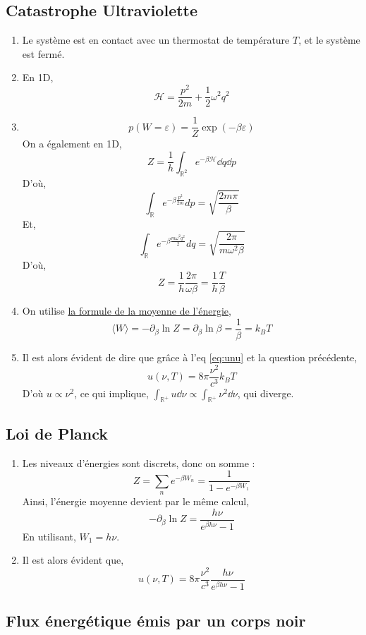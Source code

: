 \documentclass[a4paper,10pt]{report}
\begin{document}
	\subsection{Catastrophe Ultraviolette}
	\begin{enumerate}
	\item Le système est en contact avec un thermostat de température $T$, et le système est fermé.
	\item En 1D, $$\mathcal H = \frac{p^2}{2m} + \frac 1 2\omega^2 q^2$$
	\item $$p(W = \varepsilon) = \frac 1 Z \exp(-\beta \varepsilon)$$
	On a également en 1D, $$Z = \frac{1}{h} \int_{\mathbb{R}^2} e^{-\beta \mathcal H} \dd q \dd p$$
	D'où,
	$$\int_\mathbb{R} e^{-\beta \frac{p^2}{2m}} dp  = \sqrt{\frac{2m\pi}{\beta}}$$
	Et, $$\int_\mathbb{R} e^{-\beta \frac{m \omega^2 q^2}{2}} dq  = \sqrt{\frac{2\pi}{m\omega^2\beta}}$$
	D'où, $$Z = \frac 1 h \frac{2\pi}{\omega \beta} = \frac 1 h\frac{T}{\beta}$$
	\item On utilise \hyperref[subsubsec:statistique]{la formule de la moyenne de l'énergie}, $$\langle W \rangle = - \partial_\beta \ln Z = \partial_\beta \ln \beta = \frac 1 \beta = k_B T$$
		\item Il est alors évident de dire que grâce à l'eq \ref{eq:unu} et la question précédente,
	$$u(\nu,T) = 8\pi \frac{\nu^2}{c^3}k_BT$$
D'où $u \propto \nu^2$, ce qui implique, $\int_{\mathbb{R}^+ } u \dd\nu \propto \int_{\mathbb{R}^+ }\nu^2 \dd\nu$, qui diverge. 
	\end{enumerate}
	\subsection{Loi de Planck}

	\begin{enumerate}
	\item Les niveaux d'énergies sont discrets, donc on somme : $$Z = \sum_n e^{-\beta W_n} = \frac{1}{1 - e^{-\beta W_1}}$$
	Ainsi, l'énergie moyenne devient par le même calcul,
	$$- \partial_\beta \ln Z  = \frac{h\nu}{e^{\beta h\nu}-1}$$
	En utilisant, $W_1 = h\nu$.
	\item Il est alors évident que, 
	\begin{equation*}
u(\nu, T) = 8\pi\frac{\nu^2}{c^3} \frac{h\nu}{e^{\beta h \nu}-1} \label{eq:unu}\tag{4.6.2}
	\end{equation*}
	\end{enumerate}
	
	\subsection{Flux énergétique émis par un corps noir}
	
\end{document}
